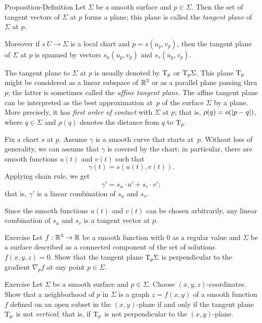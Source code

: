 \begin{thm}{Proposition-Definition}\label{def:tangent-plane}
Let $\Sigma$ be a smooth surface and $p\in \Sigma$.
Then the set of tangent vectors of $\Sigma$ at $p$ forms a plane;
this plane is called the \emph{tangent plane} of $\Sigma$ at $p$.

Moreover if $s\:U\to \Sigma$ is a local chart and $p=s(u_p,v_p)$, then 
the tangent plane of $\Sigma$ at $p$ is spanned by vectors $s_u(u_p,v_p)$ and $s_v(u_p,v_p)$.
\end{thm}

The tangent plane to $\Sigma$ at $p$ is usually denoted by $\mathrm{T}_p$ or $\mathrm{T}_p\Sigma$.
This plane $\mathrm{T}_p$ might be considered as a linear subspace of $\mathbb{R}^3$ or as a parallel plane passing thru $p$;
the latter is sometimes called the \emph{affine tangent plane}.
The affine tangent plane can be interpreted as the best approximation at~$p$ of the surface $\Sigma$ by a plane.
More precisely, 
it has \emph{first order of contact} with $\Sigma$ at $p$;
that is, $\rho(q)\z=o(|p-q|)$, where $q\in \Sigma$ and $\rho(q)$ denotes the distance from $q$ to $\mathrm{T}_p$.

Fix a chart $s$ at $p$.
Assume $\gamma$ is a smooth curve that starts at~$p$.
Without loss of generality, we can assume that $\gamma$ is covered by the chart;
in particular, there are smooth functions $u(t)$ and $v(t)$ such that 
\[\gamma(t)=s(u(t),v(t)).\]
Applying chain rule, we get
\[\gamma'=s_u\cdot u'+ s_v\cdot v';\]
that is, $\gamma'$ is a linear combination of $s_u$ and $s_v$.

Since the smooth functions $u(t)$ and $v(t)$ can be chosen arbitrarily, any linear combination of $s_u$ and $s_v$ is a tangent vector at $p$. 
\qeds


\begin{thm}{Exercise}\label{ex:tangent-normal}
Let $f:\mathbb{R}^3\to\mathbb{R}$ be a smooth function with $0$ as a regular value and $\Sigma$ be a surface described as a connected component of the set of solutions $f(x,y,z)=0$.
Show that the tangent plane $\mathrm{T}_p\Sigma$ is perpendicular to the gradient $\nabla_pf$ at any point $p\in\Sigma$.
\end{thm}

\begin{thm}{Exercise}\label{ex:vertical-tangent}
Let $\Sigma$ be a smooth surface and $p\in\Sigma$.
Choose $(x,y,z)$-coordinates.
Show that a neighborhood of $p$ in $\Sigma$ is a graph $z=f(x,y)$ of a smooth function $f$ defined on an open subset in the $(x,y)$-plane if and only if the tangent plane $\mathrm{T}_p$ is not {}\emph{vertical}; that is, if $\mathrm{T}_p$ is not perpendicular to the $(x,y)$-plane.
\end{thm}


